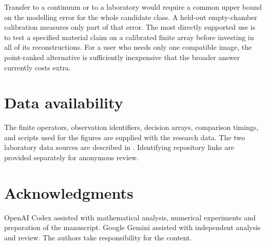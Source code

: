 \documentclass[anonymous,12pt]{iopjournal}
\numberwithin{equation}{section}
\begin{document}
Transfer to a continuum or to a laboratory would require a common upper bound on the modelling error for the whole candidate class. A held-out empty-chamber calibration measures only part of that error. The most directly supported use is to test a specified material claim on a calibrated finite array before investing in all of its reconstructions. For a user who needs only one compatible image, the point-ranked alternative is sufficiently inexpensive that the broader answer currently costs extra.
\appendix

\section*{Data availability}
The finite operators, observation identifiers, decision arrays, comparison timings, and scripts used for the figures are supplied with the research data. The two laboratory data sources are described in \cite{fresnel,manitoba}. Identifying repository links are provided separately for anonymous review.
\section*{Acknowledgments}
OpenAI Codex assisted with mathematical analysis, numerical experiments and preparation of the manuscript. Google Gemini assisted with independent analysis and review. The authors take responsibility for the content.

\end{document}
